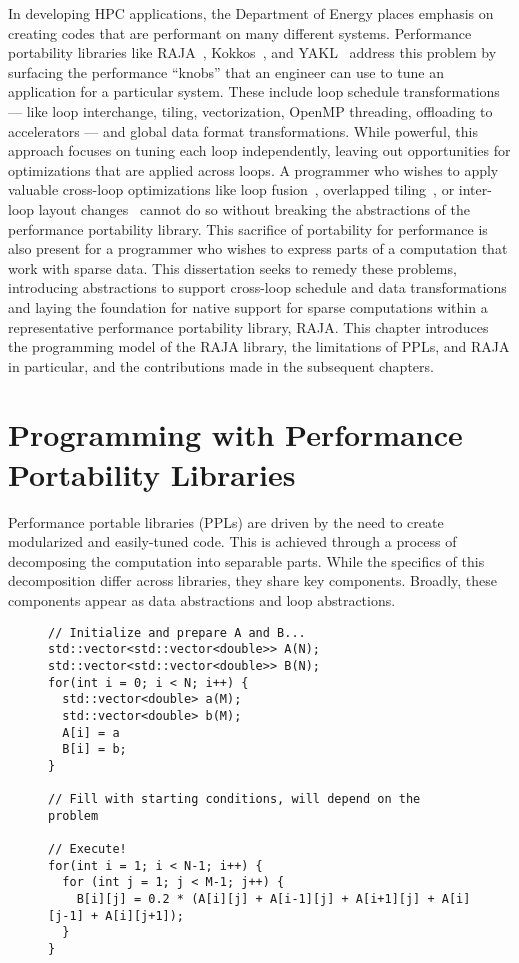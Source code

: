 In developing HPC applications, the Department of Energy places emphasis on creating codes that are performant on many different systems.
Performance portability libraries like RAJA~\cite{hornung2014RAJA}, Kokkos~\cite{edwards2014kokkos}, and YAKL~\cite{norman2022portable} address this problem by surfacing the performance ``knobs'' that an engineer can use to tune an application for a particular system. 
These include loop schedule transformations --- like loop interchange, tiling, vectorization, OpenMP threading, offloading to accelerators --- and global data format transformations.
While powerful, this approach focuses on tuning each loop independently, leaving out opportunities for optimizations that are applied across loops.
A programmer who wishes to apply valuable cross-loop optimizations like loop fusion~\cite{mckinley1996improving}, overlapped tiling~\cite{bertolacci2019using,zhou2012hierarchical,CathieSC14}, or inter-loop layout changes~\cite{kennedy1995automatic,kennedy1998automatic} cannot do so without breaking the abstractions of the performance portability library.
This sacrifice of portability for performance is also present for a programmer who wishes to express parts of a computation that work with sparse data.
This dissertation seeks to remedy these problems, introducing abstractions to support cross-loop schedule and data transformations and laying the foundation for native support for sparse computations within a representative performance portability library, RAJA\@.
This chapter introduces the programming model of the RAJA library, the limitations of PPLs, and RAJA in particular, and the contributions made in the subsequent chapters. 

\section{Programming with Performance Portability Libraries}

Performance portable libraries (PPLs) are driven by the need to create modularized and easily-tuned code.
This is achieved through a process of decomposing the computation into separable parts.
While the specifics of this decomposition differ across libraries, they share key components.
Broadly, these components appear as data abstractions and loop abstractions.

\begin{figure}[h]
\begin{lstlisting}[caption={C++ reference implementation of a 5-point stencil computation.},label=stencilCpp]
// Initialize and prepare A and B...
std::vector<std::vector<double>> A(N);
std::vector<std::vector<double>> B(N);
for(int i = 0; i < N; i++) {
  std::vector<double> a(M);
  std::vector<double> b(M);
  A[i] = a
  B[i] = b;
}

// Fill with starting conditions, will depend on the problem

// Execute!
for(int i = 1; i < N-1; i++) {
  for (int j = 1; j < M-1; j++) {
    B[i][j] = 0.2 * (A[i][j] + A[i-1][j] + A[i+1][j] + A[i][j-1] + A[i][j+1]);
  }
}
\end{lstlisting}
\end{figure}

